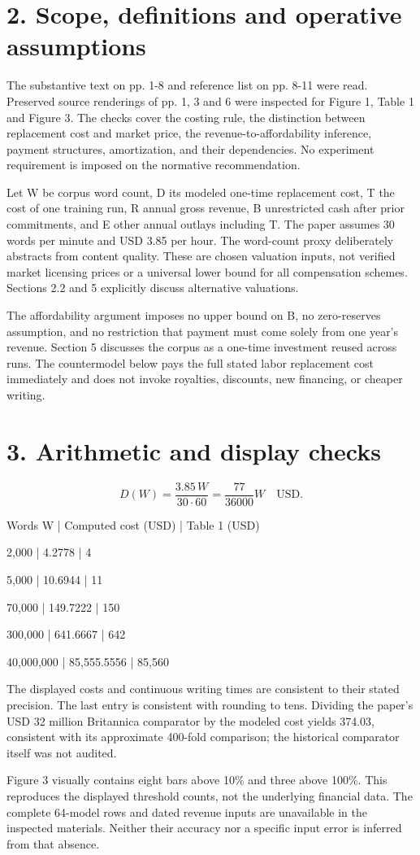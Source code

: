 \documentclass[10pt]{article}
\begin{document}
\section*{2. Scope, definitions and operative assumptions}
The substantive text on pp. 1-8 and reference list on pp. 8-11 were read. Preserved source renderings of pp. 1, 3 and 6 were inspected for Figure 1, Table 1 and Figure 3. The checks cover the costing rule, the distinction between replacement cost and market price, the revenue-to-affordability inference, payment structures, amortization, and their dependencies. No experiment requirement is imposed on the normative recommendation.\par
Let W be corpus word count, D its modeled one-time replacement cost, T the cost of one training run, R annual gross revenue, B unrestricted cash after prior commitments, and E other annual outlays including T. The paper assumes 30 words per minute and USD 3.85 per hour. The word-count proxy deliberately abstracts from content quality. These are chosen valuation inputs, not verified market licensing prices or a universal lower bound for all compensation schemes. Sections 2.2 and 5 explicitly discuss alternative valuations.\par
The affordability argument imposes no upper bound on B, no zero-reserves assumption, and no restriction that payment must come solely from one year’s revenue. Section 5 discusses the corpus as a one-time investment reused across runs. The countermodel below pays the full stated labor replacement cost immediately and does not invoke royalties, discounts, new financing, or cheaper writing.\par
\section*{3. Arithmetic and display checks}
\[D(W)=\frac{3.85\,W}{30\cdot60}=\frac{77}{36000}W\quad\text{USD}.\]\par
Words W | Computed cost (USD) | Table 1 (USD)\par
2,000 | 4.2778 | 4\par
5,000 | 10.6944 | 11\par
70,000 | 149.7222 | 150\par
300,000 | 641.6667 | 642\par
40,000,000 | 85,555.5556 | 85,560\par
The displayed costs and continuous writing times are consistent to their stated precision. The last entry is consistent with rounding to tens. Dividing the paper’s USD 32 million Britannica comparator by the modeled cost yields 374.03, consistent with its approximate 400-fold comparison; the historical comparator itself was not audited.\par
Figure 3 visually contains eight bars above 10\% and three above 100\%. This reproduces the displayed threshold counts, not the underlying financial data. The complete 64-model rows and dated revenue inputs are unavailable in the inspected materials. Neither their accuracy nor a specific input error is inferred from that absence.\par
\end{document}
